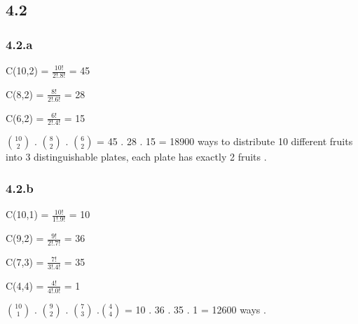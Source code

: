 \documentclass[12pt]{article}
\begin{document}
\subsection*{4.2} 
\subsubsection*{4.2.a} 
\hspace{15px} C(10,2) = $\frac{10!}{2!.8!}$ = 45 \\ \par 
C(8,2) = $\frac{8!}{2!.6!}$ = 28 \\ \par 
C(6,2) = $\frac{6!}{2!.4!}$ = 15 \\ \par 
 
$10 \choose 2$ . $8 \choose 2$ . $6 \choose 2$  = 45 . 28 . 15  = 18900 ways to distribute 10 different fruits into 3 distinguishable plates, each plate has exactly 2 fruits .
\subsubsection*{4.2.b}
\hspace{15px} C(10,1) = $\frac{10!}{1!.9!}$ = 10 \\ \par 
C(9,2) = $\frac{9!}{2!.7!}$ = 36 \\ \par 
C(7,3) = $\frac{7!}{3!.4!}$ = 35 \\ \par 
C(4,4) = $\frac{4!}{4!.0!}$ = 1 \\ \par 

$10 \choose 1$ . $9 \choose 2$ . $7 \choose 3$ .$4 \choose 4$ = 10 . 36 . 35 . 1  = 12600 ways .
\end{document}

